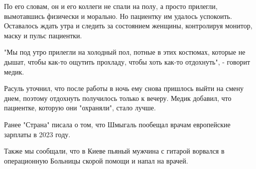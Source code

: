 По его словам, он и его коллеги не спали на полу, а просто прилегли,
вымотавшись физически и морально. Но пациентку им удалось успокоить. Оставалось
ждать утра и следить за состоянием женщины, контролируя монитор, маску и пульс
пациентки.

"Мы под утро прилегли на холодный пол, потные в этих костюмах, которые не
дышат, чтобы как-то ощутить прохладу, чтобы хоть как-то отдохнуть", - говорит
медик. 

Расуль уточнил, что после работы в ночь ему снова пришлось выйти на смену днем,
поэтому отдохнуть получилось только к вечеру. Медик добавил, что пациентке,
которую они "охраняли", стало лучше. 

Ранее "Страна" писала о том, что Шмыгаль пообещал врачам европейские зарплаты в
2023 году.

Также мы сообщали, что в Киеве пьяный мужчина с гитарой ворвался в операционную
Больницы скорой помощи и напал на врачей.


